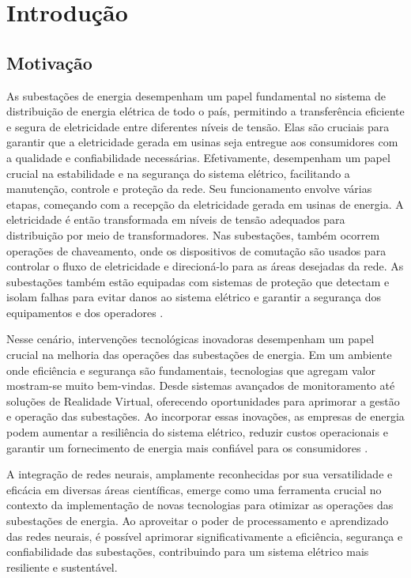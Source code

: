 \chapter{Introdução}

\section{Motivação}
\label{sec:motivation}

As subestações de energia desempenham um papel fundamental no sistema de distribuição de energia elétrica de todo o país, permitindo a transferência eficiente e segura de eletricidade entre diferentes níveis de tensão. Elas são cruciais para garantir que a eletricidade gerada em usinas seja entregue aos consumidores com a qualidade e confiabilidade necessárias. Efetivamente, desempenham um papel crucial na estabilidade e na segurança do sistema elétrico, facilitando a manutenção, controle e proteção da rede. Seu funcionamento envolve várias etapas, começando com a recepção da eletricidade gerada em usinas de energia. A eletricidade é então transformada em níveis de tensão adequados para distribuição por meio de transformadores. Nas subestações, também ocorrem operações de chaveamento, onde os dispositivos de comutação são usados para controlar o fluxo de eletricidade e direcioná-lo para as áreas desejadas da rede. As subestações também estão equipadas com sistemas de proteção que detectam e isolam falhas para evitar danos ao sistema elétrico e garantir a segurança dos equipamentos e dos operadores \cite{randolph2013electric}.

Nesse cenário, intervenções tecnológicas inovadoras desempenham um papel crucial na melhoria das operações das subestações de energia. Em um ambiente onde eficiência e segurança são fundamentais, tecnologias que agregam valor mostram-se muito bem-vindas. Desde sistemas avançados de monitoramento até soluções de Realidade Virtual, oferecendo oportunidades para aprimorar a gestão e operação das subestações. Ao incorporar essas inovações, as empresas de energia podem aumentar a resiliência do sistema elétrico, reduzir custos operacionais e garantir um fornecimento de energia mais confiável para os consumidores \cite{zhou2016big}.

A integração de redes neurais, amplamente reconhecidas por sua versatilidade e eficácia em diversas áreas científicas, emerge como uma ferramenta crucial no contexto da implementação de novas tecnologias para otimizar as operações das subestações de energia. Ao aproveitar o poder de processamento e aprendizado das redes neurais, é possível aprimorar significativamente a eficiência, segurança e confiabilidade das subestações, contribuindo para um sistema elétrico mais resiliente e sustentável.

